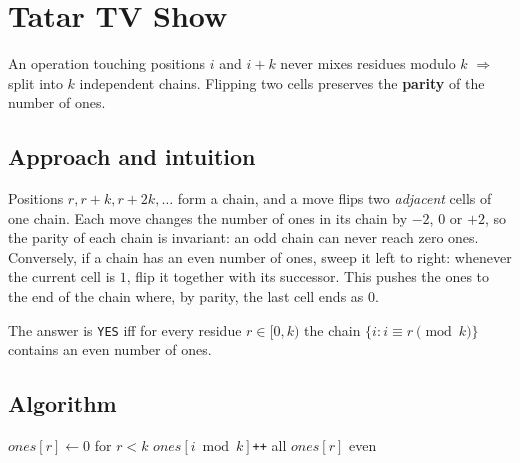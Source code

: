 \section{Tatar TV Show}
\label{sec:g-tatar}


\begin{patternbox}
An operation touching positions $i$ and $i+k$ never mixes residues modulo
$k$ $\Rightarrow$ split into $k$ independent chains. Flipping two cells
preserves the \textbf{parity} of the number of ones.
\end{patternbox}

\subsection*{Approach and intuition}

Positions $r, r+k, r+2k,\dots$ form a chain, and a move flips two
\emph{adjacent} cells of one chain. Each move changes the number of ones in
its chain by $-2$, $0$ or $+2$, so the parity of each chain is invariant:
an odd chain can never reach zero ones. Conversely, if a chain has an even
number of ones, sweep it left to right: whenever the current cell is $1$, flip
it together with its successor. This pushes the ones to the end of the chain
where, by parity, the last cell ends as $0$.

\begin{ideabox}[Criterion]
The answer is \texttt{YES} iff for every residue $r\in[0,k)$ the chain
$\{i: i\equiv r \pmod k\}$ contains an even number of ones.
\end{ideabox}

\subsection*{Algorithm}
\begin{algorithmic}[1]
\State $ones[r]\gets0$ for $r<k$
  $ones[i\bmod k]$\texttt{++} \EndIf \EndFor
\State \Return all $ones[r]$ even
\end{algorithmic}


